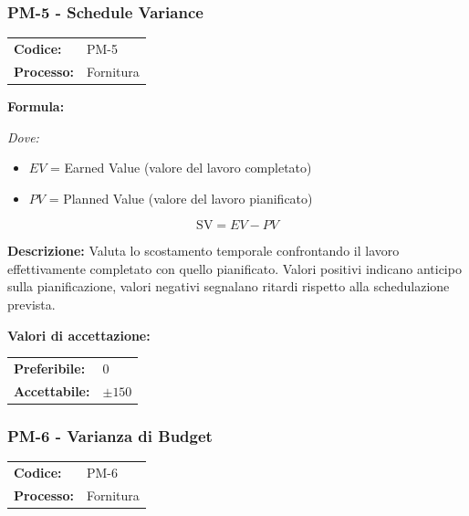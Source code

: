 \documentclass[a4paper,11pt,oneside]{scrartcl}
\begin{document}
\subsubsection{PM-5 - Schedule Variance}

\noindent
\begin{tabular}{@{}p{}p{}@{}}
\textbf{Codice:} & PM-5 \\
\textbf{Processo:} & Fornitura \\
\end{tabular}

\vspace{0.3cm}
\noindent\textbf{Formula:}

\noindent\textit{Dove:}
\begin{itemize}[leftmargin=1.5cm, topsep=0pt, itemsep=0pt]
    \item $EV$ = Earned Value (valore del lavoro completato)
    \item $PV$ = Planned Value (valore del lavoro pianificato)
\end{itemize}

\[
\text{SV} = EV - PV
\]

\noindent\textbf{Descrizione:} Valuta lo scostamento temporale confrontando il lavoro effettivamente completato con quello pianificato. Valori positivi indicano anticipo sulla pianificazione, valori negativi segnalano ritardi rispetto alla schedulazione prevista.

\vspace{0.2cm}
\noindent\textbf{Valori di accettazione:}
\vspace{0.1cm}

\noindent
\begin{tabular}{@{}ll@{}}
\textbf{Preferibile:} & $0$ \\
\textbf{Accettabile:} & $\pm 150$ \\
\end{tabular}

\subsubsection{PM-6 - Varianza di Budget}

\noindent
\begin{tabular}{@{}p{}p{}@{}}
\textbf{Codice:} & PM-6 \\
\textbf{Processo:} & Fornitura \\
\end{tabular}
\end{document}
